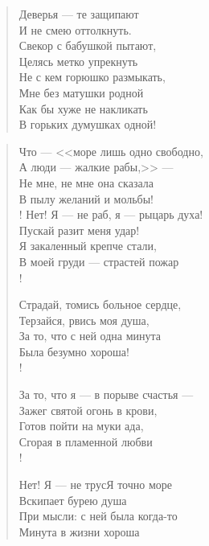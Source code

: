 \begin{verse}
\begin{altverse}
Деверья --- те защипают\ldotst\\
    И не смею оттолкнуть.\\
Свекор с бабушкой пытают,\\
    Целясь метко упрекнуть\ldotst\\
Не с кем горюшко размыкать,\\
    Мне без матушки родной\ldotst\\
Как бы хуже не накликать\\
    В горьких думушках одной!\\
\end{altverse}
\end{verse}

\newpage
\vspace*{0cm}


\begin{verse}
\begin{altverse}
Что --- <<море лишь одно свободно,\\
А люди --- жалкие рабы,>> ---\\
Не мне, не мне она сказала\\
В пылу желаний и мольбы!\\!
Нет! Я --- не раб, я --- рыцарь духа!\\
Пускай разит меня удар!\\
Я закаленный крепче стали,\\
В моей груди --- страстей пожар\ldotse\\!

Страдай, томись больное сердце,\\
Терзайся, рвись моя душа,\\
За то, что с ней одна минута\\
Была безумно хороша!\\!

За то, что я --- в порыве счастья ---\\
Зажег святой огонь в крови,\\
Готов пойти на муки ада,\\
Сгорая в пламенной любви\ldotst\\!

Нет! Я --- не трус\ldotse Я точно море\ldotse\\
Вскипает бурею душа\\
При мысли: с ней была когда-то\\
Минута в жизни хороша\ldotst
\end{altverse}
\end{verse}

